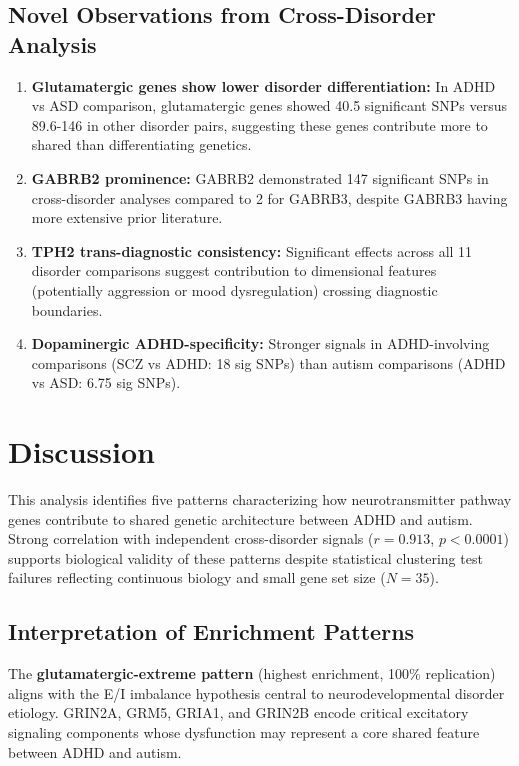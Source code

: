 \documentclass[12pt,letterpaper]{article}
\theoremstyle{definition}
\theoremstyle{remark}
\begin{document}
\subsection{Novel Observations from Cross-Disorder Analysis}

\begin{enumerate}
    \item \textbf{Glutamatergic genes show lower disorder differentiation:} In ADHD vs ASD comparison, glutamatergic genes showed 40.5 significant SNPs versus 89.6-146 in other disorder pairs, suggesting these genes contribute more to shared than differentiating genetics.

    \item \textbf{GABRB2 prominence:} GABRB2 demonstrated 147 significant SNPs in cross-disorder analyses compared to 2 for GABRB3, despite GABRB3 having more extensive prior literature.

    \item \textbf{TPH2 trans-diagnostic consistency:} Significant effects across all 11 disorder comparisons suggest contribution to dimensional features (potentially aggression or mood dysregulation) crossing diagnostic boundaries.

    \item \textbf{Dopaminergic ADHD-specificity:} Stronger signals in ADHD-involving comparisons (SCZ vs ADHD: 18 sig SNPs) than autism comparisons (ADHD vs ASD: 6.75 sig SNPs).
\end{enumerate}

\section{Discussion}

This analysis identifies five patterns characterizing how neurotransmitter pathway genes contribute to shared genetic architecture between ADHD and autism. Strong correlation with independent cross-disorder signals ($r=0.913$, $p<0.0001$) supports biological validity of these patterns despite statistical clustering test failures reflecting continuous biology and small gene set size ($N=35$).

\subsection{Interpretation of Enrichment Patterns}

The \textbf{glutamatergic-extreme pattern} (highest enrichment, 100\% replication) aligns with the E/I imbalance hypothesis central to neurodevelopmental disorder etiology\cite{rubenstein2003,nelson2015}. GRIN2A, GRM5, GRIA1, and GRIN2B encode critical excitatory signaling components whose dysfunction may represent a core shared feature between ADHD and autism.
\end{document}

